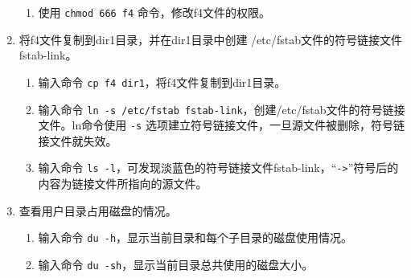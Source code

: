 \begin{enumerate}
\begin{enumerate}
      \item 使用 \verb|chmod 666 f4| 命令，修改f4文件的权限。
    \end{enumerate}
  \item 将f4文件复制到dir1目录，并在dir1目录中创建 /etc/fstab文件的符号链接文件fstab-link。
    \begin{enumerate}
      \item 输入命令 \verb|cp f4 dir1|，将f4文件复制到dir1目录。
      \item 输入命令 \verb|ln -s /etc/fstab fstab-link|，创建/etc/fstab文件的符号链接文件。ln命令使用 \verb|-s| 选项建立符号链接文件，一旦源文件被删除，符号链接文件就失效。
      \item 输入命令 \verb|ls -l|，可发现淡蓝色的符号链接文件fstab-link，“\verb|->|”符号后的内容为链接文件所指向的源文件。
    \end{enumerate}
  \item 查看用户目录占用磁盘的情况。
    \begin{enumerate}
      \item 输入命令 \verb|du -h|，显示当前目录和每个子目录的磁盘使用情况。
      \item 输入命令 \verb|du -sh|，显示当前目录总共使用的磁盘大小。
    \end{enumerate}
\end{enumerate}

